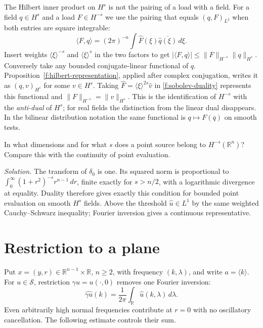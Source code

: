 The Hilbert inner product on $H^s$ is not the pairing of a load with a field. For a field $q\in H^s$ and a load $F\in H^{-s}$ we use the pairing that equals $(q,F)_{L^2}$ when both entries are square integrable:
\begin{equation}
 \langle F,q\rangle=(2\pi)^{-n}\int\widehat F(\xi)\overline{\widehat q(\xi)}\,d\xi .\label{f:sobolev-duality}
\end{equation}
Insert weights $\langle\xi\rangle^{-s}$ and $\langle\xi\rangle^s$ in the two factors to get $|\langle F,q\rangle|\leq\|F\|_{H^{-s}}\|q\|_{H^s}$. Conversely take any bounded conjugate-linear functional of $q$. Proposition~\ref{f:hilbert-representation}, applied after complex conjugation, writes it as $(q,v)_{H^s}$ for some $v\in H^s$. Taking $\widehat F=\langle\xi\rangle^{2s}\widehat v$ in \eqref{f:sobolev-duality} represents this functional and $\|F\|_{H^{-s}}=\|v\|_{H^s}$. This is the identification of $H^{-s}$ with the \emph{anti-dual} of $H^s$; for real fields the distinction from the linear dual disappears. In the bilinear distribution notation the same functional is $q\mapsto F(\overline q)$ on smooth tests.

\begin{exercise}
In what dimensions and for what $s$ does a point source belong to $H^{-s}(\mathbb R^n)$? Compare this with the continuity of point evaluation.
\end{exercise}
\noindent\emph{Solution.} The transform of $\delta_0$ is one. Its squared norm is proportional to $\int_0^\infty (1+r^2)^{-s}r^{n-1}\,dr$, finite exactly for $s>n/2$, with a logarithmic divergence at equality. Duality therefore gives exactly this condition for bounded point evaluation on smooth $H^s$ fields. Above the threshold $\widehat u\in L^1$ by the same weighted Cauchy--Schwarz inequality; Fourier inversion gives a continuous representative.

\section{Restriction to a plane}\label{f:plane-restriction}

Put $x=(y,r)\in\mathbb R^{n-1}\times\mathbb R$, $n\geq2$, with frequency $(k,\lambda)$, and write $a=\langle k\rangle$. For $u\in\mathcal S$, restriction $\gamma u=u(\cdot,0)$ removes one Fourier inversion:
\begin{equation}
  \widehat{\gamma u}(k)=\frac1{2\pi}\int_{\mathbb R}\widehat u(k,\lambda)\,d\lambda .\label{f:trace-fourier}
\end{equation}
Even arbitrarily high normal frequencies contribute at $r=0$ with no oscillatory cancellation. The following estimate controls their sum.

